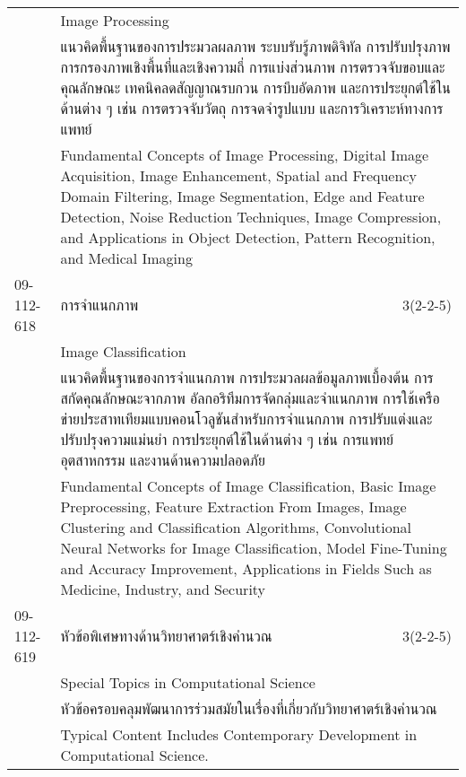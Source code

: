 \begin{longtable}{p{}p{}r{}}
 & Image Processing & \phantom{x} \vspace{3mm} \\*
&  \multicolumn{2}{p{0.75\textwidth}}{แนวคิดพื้นฐานของการประมวลผลภาพ ระบบรับรู้ภาพดิจิทัล การปรับปรุงภาพ การกรองภาพเชิงพื้นที่และเชิงความถี่ การแบ่งส่วนภาพ การตรวจจับขอบและคุณลักษณะ เทคนิคลดสัญญาณรบกวน การบีบอัดภาพ และการประยุกต์ใช้ในด้านต่าง ๆ เช่น การตรวจจับวัตถุ การจดจำรูปแบบ และการวิเคราะห์ทางการแพทย์} \vspace{3mm} \\*
&  \multicolumn{2}{p{0.75\textwidth}}{Fundamental Concepts of Image Processing, Digital Image Acquisition, Image Enhancement, Spatial and Frequency Domain Filtering, Image Segmentation, Edge and Feature Detection, Noise Reduction Techniques, Image Compression, and Applications in Object Detection, Pattern Recognition, and Medical Imaging} \vspace{8mm} \\*
09-112-618 & การจำแนกภาพ & 3(2-2-5)\\*
 & Image Classification & \phantom{x} \vspace{3mm} \\*
&  \multicolumn{2}{p{0.75\textwidth}}{แนวคิดพื้นฐานของการจำแนกภาพ การประมวลผลข้อมูลภาพเบื้องต้น การสกัดคุณลักษณะจากภาพ อัลกอริทึมการจัดกลุ่มและจำแนกภาพ การใช้เครือข่ายประสาทเทียมแบบคอนโวลูชันสำหรับการจำแนกภาพ การปรับแต่งและปรับปรุงความแม่นยำ การประยุกต์ใช้ในด้านต่าง ๆ เช่น การแพทย์ อุตสาหกรรม และงานด้านความปลอดภัย} \vspace{3mm} \\*
&  \multicolumn{2}{p{0.75\textwidth}}{Fundamental Concepts of Image Classification, Basic Image Preprocessing, Feature Extraction From Images, Image Clustering and Classification Algorithms, Convolutional Neural Networks for Image Classification, Model Fine-Tuning and Accuracy Improvement, Applications in Fields Such as Medicine, Industry, and Security} \vspace{8mm} \\*
09-112-619 & หัวข้อพิเศษทางด้านวิทยาศาตร์เชิงคำนวณ & 3(2-2-5)\\*
 & Special Topics in Computational Science & \phantom{x} \vspace{3mm} \\*
&  \multicolumn{2}{p{0.75\textwidth}}{หัวข้อครอบคลุมพัฒนาการร่วมสมัยในเรื่องที่เกี่ยวกับวิทยาศาตร์เชิงคำนวณ} \vspace{3mm} \\*
&  \multicolumn{2}{p{0.75\textwidth}}{Typical Content Includes Contemporary Development in Computational Science.} \vspace{8mm} \\*
\end{longtable}
